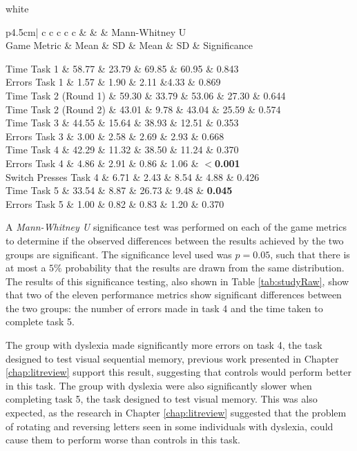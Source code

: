 \documentclass[journal]{IEEEtran}
\newcommand{\tableformat}[4]{
\begin{table}[h]
\centering
  \rowcolors{2}{gray!10} {white}
\begin{tabular}{#1}
  \hline
  \rowcolor[gray]{0.9} #2
\end{tabular}
\caption{#3}
\label{#4}
\end{table}}
\begin{document}
\tableformat{p{4.5cm}| c c c c c}{
\hline
{}  & \multicolumn{2}{ c }{With Dyslexia} & \multicolumn{2}{ c }{Controls} & Mann-Whitney U \\ 
\rowcolor{gray!30} Game Metric & Mean & SD & Mean & SD & Significance\\ \hline

Time Task 1 & 58.77 & 23.79 & 69.85 & 60.95 & 0.843\\
Errors Task 1 & 1.57 & 1.90  &  2.11 &4.33 & 0.869 \\

Time Task 2 (Round 1)  & 59.30 & 33.79 & 53.06 & 27.30 & 0.644\\
Time Task 2 (Round 2)  & 43.01 &  9.78 & 43.04 &  25.59 & 0.574\\

Time Task 3  & 44.55  &  15.64 & 38.93 & 12.51 & 0.353 \\
Errors Task 3  & 3.00 & 2.58 & 2.69 &  2.93 & 0.668 \\

Time Task 4 & 42.29 & 11.32 & 38.50  & 11.24 & 0.370 \\
Errors Task 4 & 4.86 & 2.91 & 0.86 & 1.06 & \textbf{$<$0.001}\\
Switch Presses Task 4 &  6.71 & 2.43 & 8.54 & 4.88 & 0.426 \\

Time Task 5 &  33.54 & 8.87 & 26.73 & 9.48 & \textbf{0.045} \\
Errors Task 5 & 1.00 & 0.82 &  0.83 & 1.20 & 0.370\\
}{Summary of the results obtained by the study, all times are given in seconds. }
{tab:studyRaw}

A \emph{Mann-Whitney U} significance test was performed on each of the game metrics to determine if the observed differences between the results achieved by the two groups are significant. The significance level used was $p=0.05$, such that there is at most a $5\%$ probability that the results are drawn from the same distribution. The results of this significance testing, also shown in Table \ref{tab:studyRaw}, show that two of the eleven performance metrics show significant differences between the two groups: the number of errors made in task 4 and the time taken to complete task 5.

The group with dyslexia made significantly more errors on task 4, the task designed to test visual sequential memory, previous work presented in Chapter \ref{chap:litreview} support this result, suggesting that controls would perform better in this task.
The group with dyslexia were also significantly slower when completing task 5, the task designed to test visual memory. This was also expected, as the research in Chapter \ref{chap:litreview} suggested that the problem of rotating and reversing letters seen in some individuals with dyslexia, could cause them to perform worse than controls in this task.
\end{document}
